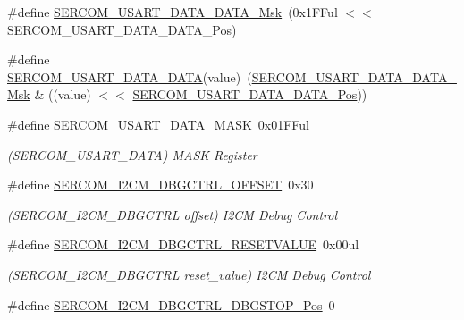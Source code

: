 \begin{DoxyCompactItemize}
\#define \mbox{\hyperlink{group___s_a_m_d21___s_e_r_c_o_m_gaeb9b3e8af4b0765e1822c9049e10bf8a}{S\+E\+R\+C\+O\+M\+\_\+\+U\+S\+A\+R\+T\+\_\+\+D\+A\+T\+A\+\_\+\+D\+A\+T\+A\+\_\+\+Msk}}~(0x1\+F\+Ful $<$$<$ S\+E\+R\+C\+O\+M\+\_\+\+U\+S\+A\+R\+T\+\_\+\+D\+A\+T\+A\+\_\+\+D\+A\+T\+A\+\_\+\+Pos)
\item 
\#define \mbox{\hyperlink{group___s_a_m_d21___s_e_r_c_o_m_gaeeb796c963c7b31f39be527ab9e65749}{S\+E\+R\+C\+O\+M\+\_\+\+U\+S\+A\+R\+T\+\_\+\+D\+A\+T\+A\+\_\+\+D\+A\+TA}}(value)~(\mbox{\hyperlink{group___s_a_m_d21___s_e_r_c_o_m_gaeb9b3e8af4b0765e1822c9049e10bf8a}{S\+E\+R\+C\+O\+M\+\_\+\+U\+S\+A\+R\+T\+\_\+\+D\+A\+T\+A\+\_\+\+D\+A\+T\+A\+\_\+\+Msk}} \& ((value) $<$$<$ \mbox{\hyperlink{group___s_a_m_d21___s_e_r_c_o_m_ga59582f5f0a9857f58a371c3ddc943e3d}{S\+E\+R\+C\+O\+M\+\_\+\+U\+S\+A\+R\+T\+\_\+\+D\+A\+T\+A\+\_\+\+D\+A\+T\+A\+\_\+\+Pos}}))
\item 
\#define \mbox{\hyperlink{group___s_a_m_d21___s_e_r_c_o_m_ga1cd041b9e29d25cd2e6fbfd2293d3847}{S\+E\+R\+C\+O\+M\+\_\+\+U\+S\+A\+R\+T\+\_\+\+D\+A\+T\+A\+\_\+\+M\+A\+SK}}~0x01\+F\+Ful
\begin{DoxyCompactList}\small\item\em (S\+E\+R\+C\+O\+M\+\_\+\+U\+S\+A\+R\+T\+\_\+\+D\+A\+TA) M\+A\+SK Register \end{DoxyCompactList}\item 
\#define \mbox{\hyperlink{group___s_a_m_d21___s_e_r_c_o_m_gadff698c8d0cc5b6bd44d17dd4787be2c}{S\+E\+R\+C\+O\+M\+\_\+\+I2\+C\+M\+\_\+\+D\+B\+G\+C\+T\+R\+L\+\_\+\+O\+F\+F\+S\+ET}}~0x30
\begin{DoxyCompactList}\small\item\em (S\+E\+R\+C\+O\+M\+\_\+\+I2\+C\+M\+\_\+\+D\+B\+G\+C\+T\+RL offset) I2\+CM Debug Control \end{DoxyCompactList}\item 
\#define \mbox{\hyperlink{group___s_a_m_d21___s_e_r_c_o_m_gaab03eb045cf3a7b62e3507c2d4ba9953}{S\+E\+R\+C\+O\+M\+\_\+\+I2\+C\+M\+\_\+\+D\+B\+G\+C\+T\+R\+L\+\_\+\+R\+E\+S\+E\+T\+V\+A\+L\+UE}}~0x00ul
\begin{DoxyCompactList}\small\item\em (S\+E\+R\+C\+O\+M\+\_\+\+I2\+C\+M\+\_\+\+D\+B\+G\+C\+T\+RL reset\+\_\+value) I2\+CM Debug Control \end{DoxyCompactList}\item 
\#define \mbox{\hyperlink{group___s_a_m_d21___s_e_r_c_o_m_ga7a07b16a2d9fa67f1bf52713bf2d937c}{S\+E\+R\+C\+O\+M\+\_\+\+I2\+C\+M\+\_\+\+D\+B\+G\+C\+T\+R\+L\+\_\+\+D\+B\+G\+S\+T\+O\+P\+\_\+\+Pos}}~0

\end{DoxyCompactItemize}
